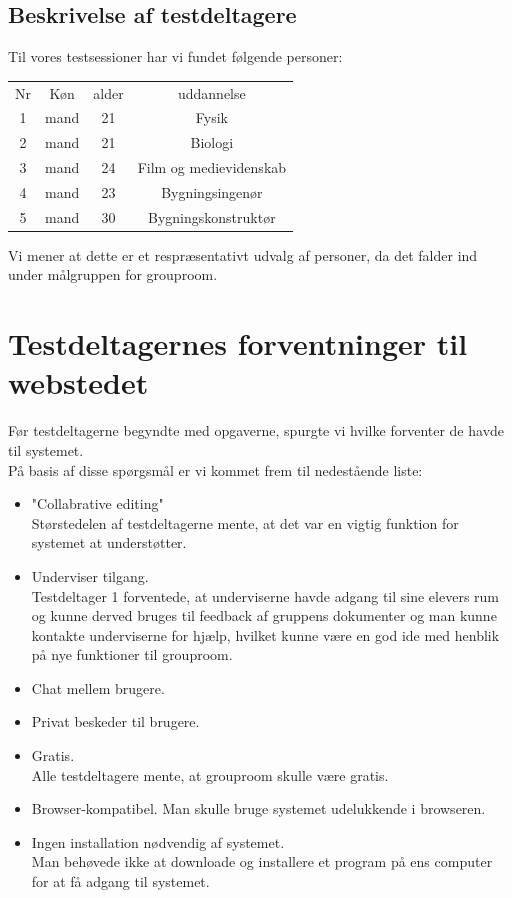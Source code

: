 \documentclass[12pt]{article}
\begin{document}
\subsection{Beskrivelse af testdeltagere}
Til vores testsessioner har vi fundet følgende personer:
\begin{center}
  \begin{tabular}{*{4}{|c}|}
    \hline
    Nr & Køn & alder & uddannelse \\
    1 & mand & 21 & Fysik \\
    2 & mand & 21 & Biologi \\
    3 & mand & 24 & Film og medievidenskab \\
    4 & mand & 23 & Bygningsingenør\\
    5 & mand & 30 & Bygningskonstruktør\\
    \hline
  \end{tabular}
\end{center}
Vi mener at dette er et respræsentativt udvalg af personer, da det falder ind under målgruppen for grouproom.
\section{Testdeltagernes forventninger til webstedet}
Før testdeltagerne begyndte med opgaverne, spurgte vi hvilke forventer de havde til systemet. \\
På basis af disse spørgsmål er vi kommet frem til nedestående liste:\\
\begin{itemize}
  \item "Collabrative editing"\\
        Størstedelen af testdeltagerne mente, at det var en vigtig funktion for systemet at understøtter. 
  \item Underviser tilgang.\\
        Testdeltager 1 forventede, at underviserne havde adgang til sine elevers rum og kunne derved bruges til feedback af gruppens
        dokumenter og man kunne kontakte underviserne for hjælp, hvilket kunne være en god ide med henblik på nye funktioner til grouproom.
  \item Chat mellem brugere.
  \item Privat beskeder til brugere.
  \item Gratis. \\
        Alle testdeltagere mente, at grouproom skulle være gratis. 
  \item Browser-kompatibel.
        Man skulle bruge systemet udelukkende i browseren.
  \item Ingen installation nødvendig af systemet.\\
        Man behøvede ikke at downloade og installere et program på ens computer for at få adgang til systemet.
\end{itemize}
\newpage
\end{document}

